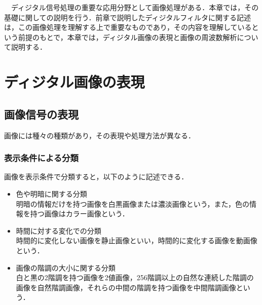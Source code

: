 
\begin{lead}

　ディジタル信号処理の重要な応用分野として画像処理がある．本章では，その基礎に関しての説明を行う．前章で説明したディジタルフィルタに関する記述は，この画像処理を理解する上で重要なものであり，その内容を理解しているという前提のもとで，本章では，ディジタル画像の表現と画像の周波数解析について説明する．

\end{lead}




\chapter{ディジタル画像の表現}

\label{chapter:image}

\section{画像信号の表現}

画像には種々の種類があり，その表現や処理方法が異なる．

\subsection{表示条件による分類}

画像を表示条件で分類すると，以下のように記述できる．

\begin{itemize}
\item 色や明暗に関する分類\\
明暗の情報だけを持つ画像を白黒画像または濃淡画像という，また，色の情報を持つ画像はカラー画像という．
\item 時間に対する変化での分類\\
時間的に変化しない画像を静止画像といい，時間的に変化する画像を動画像という．
\item 画像の階調の大小に関する分類\\
白と黒の2階調を持つ画像を2値画像，256階調以上の自然な連続した階調の画像を自然階調画像，それらの中間の階調を持つ画像を中間階調画像という．
\end{itemize}

